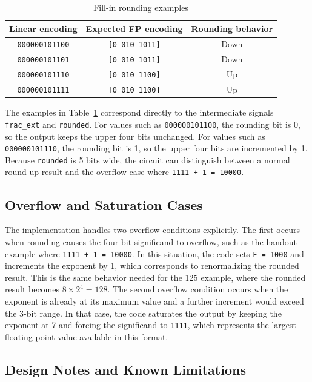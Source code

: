 \documentclass[10pt,letterpaper]{article}
\begin{document}
\begin{table}[H]
    \centering
    \caption{Fill-in rounding examples}
    \begin{tabular}{ccc}
        \toprule
        Linear encoding & Expected FP encoding & Rounding behavior \\
        \midrule
        \texttt{000000101100} & \texttt{[0 010 1011]} & Down \\
        \texttt{000000101101} & \texttt{[0 010 1011]} & Down \\
        \texttt{000000101110} & \texttt{[0 010 1100]} & Up \\
        \texttt{000000101111} & \texttt{[0 010 1100]} & Up \\
        \bottomrule
    \end{tabular}
    \label{tab:rounding}
\end{table}

The examples in Table~\ref{tab:rounding} correspond directly to the intermediate signals \texttt{frac\_ext} and \texttt{rounded}. For values such as \texttt{000000101100}, the rounding bit is 0, so the output keeps the upper four bits unchanged. For values such as \texttt{000000101110}, the rounding bit is 1, so the upper four bits are incremented by 1. Because \texttt{rounded} is 5 bits wide, the circuit can distinguish between a normal round-up result and the overflow case where \texttt{1111 + 1 = 10000}.

\subsection{Overflow and Saturation Cases}

The implementation handles two overflow conditions explicitly. The first occurs when rounding causes the four-bit significand to overflow, such as the handout example where \texttt{1111 + 1 = 10000}. In this situation, the code sets \texttt{F = 1000} and increments the exponent by 1, which corresponds to renormalizing the rounded result. This is the same behavior needed for the 125 example, where the rounded result becomes $8 \times 2^4 = 128$. The second overflow condition occurs when the exponent is already at its maximum value and a further increment would exceed the 3-bit range. In that case, the code saturates the output by keeping the exponent at 7 and forcing the significand to \texttt{1111}, which represents the largest floating point value available in this format.

\subsection{Design Notes and Known Limitations}
\end{document}
